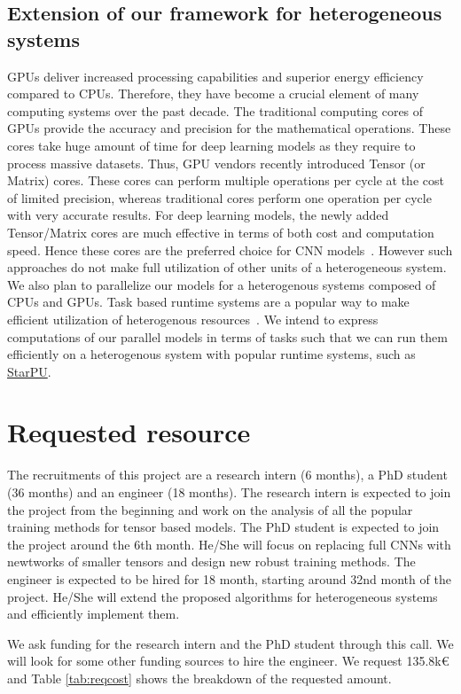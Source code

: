 \documentclass[11pt]{article}
\begin{document}
\subsection{Extension of our framework for heterogeneous systems}
GPUs deliver increased processing capabilities and superior energy efficiency compared to CPUs. Therefore, they have become a crucial element of many computing systems over the past decade. The traditional computing cores of GPUs provide the accuracy and precision for the mathematical operations. These cores take huge amount of time for deep learning models as they require to process massive datasets. Thus, GPU vendors recently introduced Tensor (or Matrix) cores. These cores can perform multiple operations per cycle at the cost of limited precision, whereas traditional cores perform one operation per cycle with very accurate results. For deep learning models, the newly added Tensor/Matrix cores are much effective in terms of both cost and computation speed. Hence these cores are the preferred choice for CNN models~\cite{KSH-Resnet-2017}. However such approaches do not make full utilization of other units of a heterogeneous system. We also plan to parallelize our models for a heterogenous systems composed of CPUs and GPUs. Task based runtime systems are a popular way to make efficient utilization of heterogenous resources~\cite{ATNW-Euro-Par-2009}. We intend to express computations of our parallel models in terms of tasks such that we can run them efficiently on a heterogenous system with popular runtime systems, such as \href{https://starpu.gitlabpages.inria.fr}{StarPU}.



\section{Requested resource}
The recruitments of this project are a research intern (6 months), a PhD student  (36 months) and an engineer (18 months). The  research intern is expected to join the project from the beginning and work on the analysis of all the popular training methods for tensor based models. The PhD student is expected to join the project around the 6th month. He/She will focus on replacing full CNNs  with newtworks of smaller tensors and design new robust training methods. The engineer is expected to be hired for 18 month, starting around 32nd month of the project. He/She will extend the proposed algorithms for heterogeneous systems and efficiently implement them. 


We ask funding for the research intern and the PhD student through this call. We will look for some other funding sources to hire the engineer.  We request 135.8k\euro\xspace and Table \ref{tab:reqcost} shows the breakdown of the requested amount.
\end{document}
